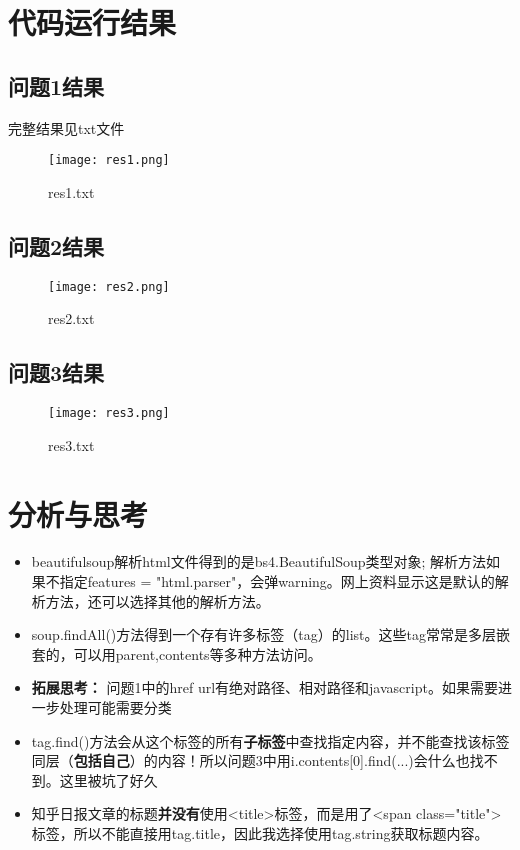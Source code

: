 \documentclass[12pt,a4paper]{article}
\begin{document}
\section{代码运行结果}
\subsection{问题1结果}
完整结果见txt文件
\begin{figure}[H]
	\texttt{[image: res1.png]}
	 \caption{res1.txt}
\end{figure}

\subsection{问题2结果}
\begin{figure}[H]
	\texttt{[image: res2.png]}
	 \caption{res2.txt}
\end{figure}

\subsection{问题3结果}
\begin{figure}[H]
	\texttt{[image: res3.png]}
	 \caption{res3.txt}
\end{figure}

\section{分析与思考}
\begin{itemize}
	\item beautifulsoup解析html文件得到的是bs4.BeautifulSoup类型对象; 解析方法如果不指定features = "html.parser"，会弹warning。网上资料显示这是默认的解析方法，还可以选择其他的解析方法。
	\item soup.findAll()方法得到一个存有许多标签（tag）的list。这些tag常常是多层嵌套的，可以用parent,contents等多种方法访问。
	\item \textbf{拓展思考：} 问题1中的href url有绝对路径、相对路径和javascript。如果需要进一步处理可能需要分类
	\item tag.find()方法会从这个标签的所有\textbf{子标签}中查找指定内容，并不能查找该标签同层（\textbf{包括自己}）的内容！所以问题3中用i.contents[0].find(...)会什么也找不到。这里被坑了好久
	\item 知乎日报文章的标题\textbf{并没有}使用<title>标签，而是用了<span class="title">标签，所以不能直接用tag.title，因此我选择使用tag.string获取标题内容。
\end{itemize}
\end{document}
